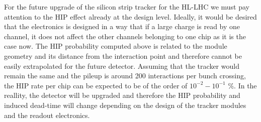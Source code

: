 For the future upgrade of the silicon strip tracker for the HL-LHC we must pay attention to the HIP effect already at the design level. Ideally, it would be desired that the electronics is designed in a way that if a large charge is read by one channel, it does not affect the other channels belonging to one chip as it is the case now. The HIP probability computed above is related to the module geometry and its distance from the interaction point and therefore cannot be easily extrapolated for the future detector. Assuming that the tracker would remain the same and the pileup is around 200 interactions per bunch crossing, the HIP rate per chip can be expected to be of the order of $10^{-2}-10^{-1}$ \%. In the reallity, the detector will be upgraded and therefore the HIP probability and induced dead-time will change depending on the design of the tracker modules and the readout electronics.

   
 

 


